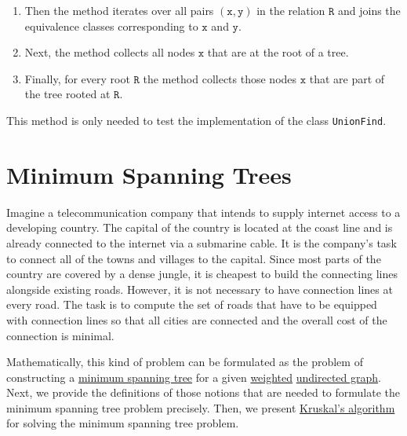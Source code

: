 \begin{enumerate}
\begin{enumerate}
      \item Then the method iterates over all pairs $(\texttt{x},\texttt{y})$ in the relation $\texttt{R}$ and
            joins the equivalence classes corresponding to $\texttt{x}$ and $\texttt{y}$.
      \item Next, the method collects all nodes $\texttt{x}$ that are at the root of a tree.
      \item Finally, for every root $\texttt{R}$ the method collects those nodes $\texttt{x}$ that are
            part of the tree rooted at $\texttt{R}$.
      \end{enumerate}
      This method is only needed to test the implementation of the class \texttt{UnionFind}.
\end{enumerate}


\section{Minimum Spanning Trees}
Imagine a telecommunication company that intends to supply internet access to a developing country.
The capital of the country is located at the coast line and is already connected to the internet via
a submarine cable. It is the company's task to connect all of the towns and villages to the capital.
Since most parts of the country are covered by a dense jungle, it is cheapest to build the connecting lines
alongside existing roads.  However, it is not necessary to have connection lines at every road.  The task is to
compute the set of roads that have to be equipped with connection lines so that all cities are connected and
the overall cost of the connection is minimal.

Mathematically, this kind of problem can be formulated as the problem of
constructing a \href{https://en.wikipedia.org/wiki/Minimum_spanning_tree}{minimum spanning tree} for
a given \href{https://en.wikipedia.org/wiki/Graph_(discrete_mathematics)#Weighted_graph}{weighted}
\href{https://en.wikipedia.org/wiki/Graph_(discrete_mathematics)#Undirected_graph}{undirected graph}.
Next, we provide the definitions of those notions that are needed to formulate the minimum spanning
tree problem precisely.  Then, we present
\href{https://en.wikipedia.org/wiki/Kruskal%27s_algorithm}{Kruskal's algorithm} for solving the
minimum spanning tree problem. 

